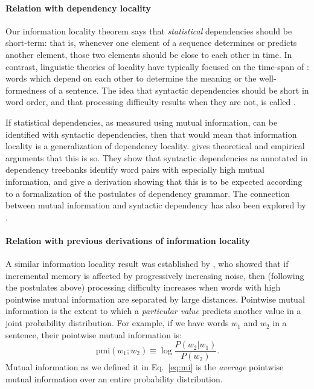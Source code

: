 \paragraph{Relation with dependency locality}
Our information locality theorem says that \emph{statistical} dependencies should be short-term: that is, whenever one element of a sequence determines or predicts another element, those two elements should be close to each other in time. In contrast, linguistic theories of locality have typically focused on the time-span of : words which depend on each other to determine the meaning or the well-formedness of a sentence. The idea that syntactic dependencies should be short in word order, and that processing difficulty results when they are not, is called . 

If statistical dependencies, as measured using mutual information, can be identified with syntactic dependencies, then that would mean that information locality is a generalization of dependency locality. \citet{futrell2019syntactic} gives theoretical and empirical arguments that this is so. They show that syntactic dependencies as annotated in dependency treebanks identify word pairs with especially high mutual information, and give a derivation showing that this is to be expected according to a formalization of the postulates of dependency grammar. The connection between mutual information and syntactic dependency has also been explored by \citet{}. 

\paragraph{Relation with previous derivations of information locality} A similar information locality result was established by \citet{futrell-noisy-context-2017}, who showed that if incremental memory is affected by progressively increasing noise, then (following the postulates above) processing difficulty increases when words with high pointwise mutual information are separated by large distances. Pointwise mutual information is the extent to which a \emph{particular value} predicts another value in a joint probability distribution. For example, if we have words $w_1$ and $w_2$ in a sentence, their pointwise mutual information is:
\begin{equation}
    \text{pmi}(w_1; w_2) \equiv \log \frac{P(w_2|w_1)}{P(w_2)}.
\end{equation}
Mutual information as we defined it in Eq.~\ref{eq:mi} is the \emph{average} pointwise mutual information over an entire probability distribution.


